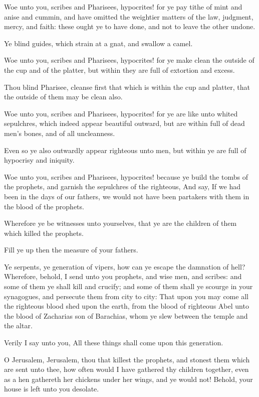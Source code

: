 \Verse Woe unto you, scribes and Pharisees, hypocrites! for ye pay tithe of mint and anise and cummin, and have omitted the weightier matters of the law, judgment, mercy, and faith: these ought ye to have done, and not to leave the other undone.

\Verse Ye blind guides, which strain at a gnat, and swallow a camel.

\Verse Woe unto you, scribes and Pharisees, hypocrites! for ye make clean the outside of the cup and of the platter, but within they are full of extortion and excess.

\Verse Thou blind Pharisee, cleanse first that which is within the cup and platter, that the outside of them may be clean also.

\Verse Woe unto you, scribes and Pharisees, hypocrites! for ye are like unto whited sepulchres, which indeed appear beautiful outward, but are within full of dead men's bones, and of all uncleanness.

\Verse Even so ye also outwardly appear righteous unto men, but within ye are full of hypocrisy and iniquity.

\Verse Woe unto you, scribes and Pharisees, hypocrites! because ye build the tombs of the prophets, and garnish the sepulchres of the righteous, \Verse And say, If we had been in the days of our fathers, we would not have been partakers with them in the blood of the prophets.

\Verse Wherefore ye be witnesses unto yourselves, that ye are the children of them which killed the prophets.

\Verse Fill ye up then the measure of your fathers.

\Verse Ye serpents, ye generation of vipers, how can ye escape the damnation of hell?  \Verse Wherefore, behold, I send unto you prophets, and wise men, and scribes: and some of them ye shall kill and crucify; and some of them shall ye scourge in your synagogues, and persecute them from city to city: \Verse That upon you may come all the righteous blood shed upon the earth, from the blood of righteous Abel unto the blood of Zacharias son of Barachias, whom ye slew between the temple and the altar.

\Verse Verily I say unto you, All these things shall come upon this generation.

\Verse O Jerusalem, Jerusalem, thou that killest the prophets, and stonest them which are sent unto thee, how often would I have gathered thy children together, even as a hen gathereth her chickens under her wings, and ye would not!  \Verse Behold, your house is left unto you desolate.

